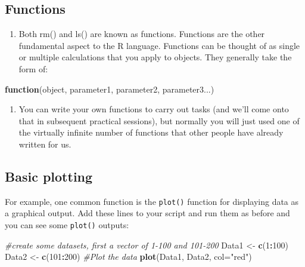 \documentclass[]{book}
\newenvironment{Shaded}{\begin{snugshade}}{\end{snugshade}}
\newcommand{\CommentTok}[1]{\textcolor[rgb]{0.56,0.35,0.01}{\textit{#1}}}
\newcommand{\ControlFlowTok}[1]{\textcolor[rgb]{0.13,0.29,0.53}{\textbf{#1}}}
\newcommand{\DataTypeTok}[1]{\textcolor[rgb]{0.13,0.29,0.53}{#1}}
\newcommand{\DecValTok}[1]{\textcolor[rgb]{0.00,0.00,0.81}{#1}}
\newcommand{\KeywordTok}[1]{\textcolor[rgb]{0.13,0.29,0.53}{\textbf{#1}}}
\newcommand{\NormalTok}[1]{#1}
\newcommand{\OperatorTok}[1]{\textcolor[rgb]{0.81,0.36,0.00}{\textbf{#1}}}
\newcommand{\StringTok}[1]{\textcolor[rgb]{0.31,0.60,0.02}{#1}}
\providecommand{\tightlist}{%
  \setlength{\itemsep}{0pt}\setlength{\parskip}{0pt}}
\begin{document}
\hypertarget{functions}{%
\subsection{Functions}\label{functions}}

\begin{enumerate}
\def\labelenumi{\arabic{enumi}.}
\setcounter{enumi}{11}
\tightlist
\item
  Both rm() and ls() are known as functions. Functions are the other fundamental aspect to the R language. Functions can be thought of as single or multiple calculations that you apply to objects. They generally take the form of:
\end{enumerate}

\begin{Shaded}
\begin{Highlighting}[]
\ControlFlowTok{function}\NormalTok{(object, parameter1, parameter2, parameter3...)}
\end{Highlighting}
\end{Shaded}

\begin{enumerate}
\def\labelenumi{\arabic{enumi}.}
\setcounter{enumi}{12}
\tightlist
\item
  You can write your own functions to carry out tasks (and we'll come onto that in subsequent practical sessions), but normally you will just used one of the virtually infinite number of functions that other people have already written for us.
\end{enumerate}

\hypertarget{basic-plotting}{%
\subsection{Basic plotting}\label{basic-plotting}}

For example, one common function is the \texttt{plot()} function for displaying data as a graphical output. Add these lines to your script and run them as before and you can see some \texttt{plot()} outputs:

\begin{Shaded}
\begin{Highlighting}[]
\CommentTok{#create some datasets, first a vector of 1-100 and 101-200}
\NormalTok{Data1 <-}\StringTok{ }\KeywordTok{c}\NormalTok{(}\DecValTok{1}\OperatorTok{:}\DecValTok{100}\NormalTok{)}
\NormalTok{Data2 <-}\StringTok{ }\KeywordTok{c}\NormalTok{(}\DecValTok{101}\OperatorTok{:}\DecValTok{200}\NormalTok{)}
\CommentTok{#Plot the data}
\KeywordTok{plot}\NormalTok{(Data1, Data2, }\DataTypeTok{col=}\StringTok{"red"}\NormalTok{)}
\end{Highlighting}
\end{Shaded}
\end{document}
